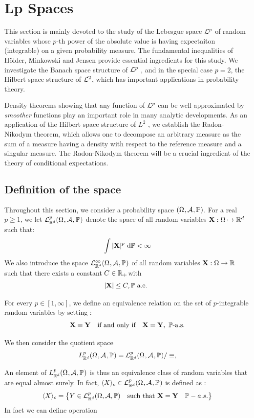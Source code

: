 \documentclass[../Main.tex]{subfiles}
\begin{document}
\section{Lp Spaces} \label{sec:Lp spaces}
This section is mainly devoted to the study of the Lebesgue space $\mathcal{L}^p$ of random variables whose $p$-th power of the absolute value is having expectaiton (integrable) on a given probability measure. The fundamental inequalities of Hölder, Minkowski and Jensen provide essential ingredients for this study. We investigate the Banach space structure of $\mathcal{L}^p$ , and in the special case $p = 2$, the Hilbert space structure of $\mathcal{L}^2$, which has important applications in probability theory. 

Density theorems showing that any function of $\mathcal{L}^p$ can be well approximated by \textit{smoother} functions play an important role in many analytic developments. As an application of the Hilbert space structure of $L^2$ , we establish the Radon-Nikodym theorem, which allows one to decompose an arbitrary measure as the sum of a measure having a density with respect to the reference measure and a singular measure. The Radon-Nikodym theorem will be a crucial ingredient of the theory of conditional expectations.


\subsection{Deﬁnition of the space}
Throughout this section, we consider a probability space $(\Omega_{}, \mathcal{A}_{}, \mathbb{P}_{})$. For a real $p \geq 1$, we let $\mathcal{L}^p_{\mathbb{R}^d}(\Omega_{}, \mathcal{A}_{}, \mathbb{P}_{})$ denote the space of all random variables $\mathbf{X}: \Omega  \mapsto \mathbb{R}^d$ such that:
\[ \int|\mathbf{X}|^p \mathrm{~d} \mathbb{P}<\infty  \]
We also introduce the space $\mathcal{L}^{\infty}_{\mathbb{R}^d}(\Omega_{}, \mathcal{A}_{}, \mathbb{P}_{})$ of all random variables $\mathbf{X}: \Omega \rightarrow \mathbb{R}$ such that there exists a constant $C \in \mathbb{R}_{+}$with
\[ |\mathbf{X}| \leq C, \mathbb{P} \text { a.e. } \]

For every $p\in[1,\infty]$, we define an equivalence relation on the set of
$p$-integrable random variables by setting : 
\[ \bX \equiv \bY \quad \text{if and only if} \quad \bX=\bY,\ \PP\text{-a.s.} \]

We then consider the quotient space
\[ L^p_{\mathbb{R}^d}(\Omega_{}, \mathcal{A}_{}, \mathbb{P}_{})= \mathcal{L}^p_{\mathbb{R}^d}(\Omega_{}, \mathcal{A}_{}, \mathbb{P}_{})/\equiv, \]

An element of $L^p_{\mathbb{R}^d}(\Omega_{}, \mathcal{A}_{}, \mathbb{P}_{})$ is thus an equivalence class of random variables that are equal almost surely. In fact, $\langle X \rangle_c\in\mathcal{L}^p_{\mathbb{R}^d}(\Omega_{}, \mathcal{A}_{}, \mathbb{P}_{})$ is defined as : 
\[ \langle X \rangle_c = \left\{ Y \in \mathcal{L}^p_{\mathbb{R}^d}(\Omega,\mathcal{A},\mathbb{P})\quad \text{such that } \mathbf{X} = \mathbf{Y} \quad \mathbb{P}-a.s. \right\}\] 
In fact we can define operation 
\end{document}

